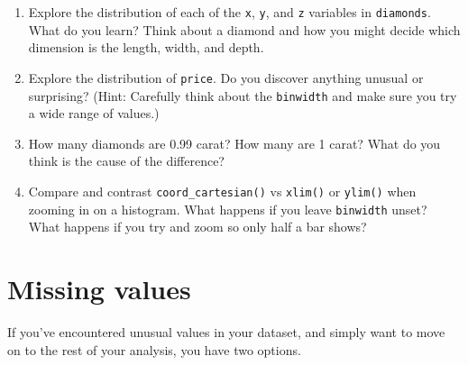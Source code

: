 \documentclass[]{book}
\begin{document}
\begin{enumerate}
\def\labelenumi{\arabic{enumi}.}
\item
  Explore the distribution of each of the \texttt{x}, \texttt{y}, and
  \texttt{z} variables in \texttt{diamonds}. What do you learn? Think
  about a diamond and how you might decide which dimension is the
  length, width, and depth.
\item
  Explore the distribution of \texttt{price}. Do you discover anything
  unusual or surprising? (Hint: Carefully think about the
  \texttt{binwidth} and make sure you try a wide range of values.)
\item
  How many diamonds are 0.99 carat? How many are 1 carat? What do you
  think is the cause of the difference?
\item
  Compare and contrast \texttt{coord\_cartesian()} vs \texttt{xlim()} or
  \texttt{ylim()} when zooming in on a histogram. What happens if you
  leave \texttt{binwidth} unset? What happens if you try and zoom so
  only half a bar shows?
\end{enumerate}

\section{Missing values}\label{missing-values-2}

If you've encountered unusual values in your dataset, and simply want to
move on to the rest of your analysis, you have two options.
\end{document}
